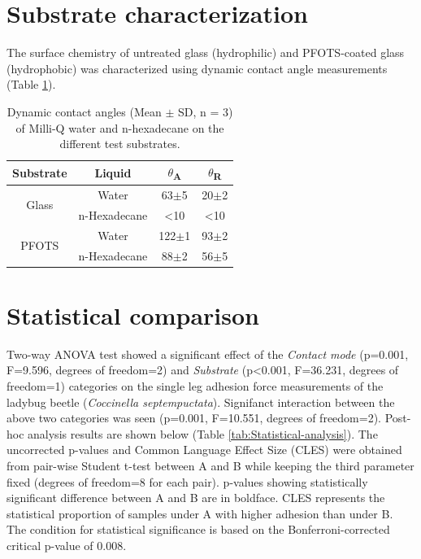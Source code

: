 \documentclass[english]{achemso}
\providecommand{\tabularnewline}{\\}
\begin{document}
\section{Substrate characterization}

The surface chemistry of untreated glass (hydrophilic) and PFOTS-coated glass (hydrophobic) was characterized using dynamic contact angle measurements (Table \ref{tab:Contact-Angles}).
\begin{table}[H]
\centering{}%
\begin{tabular}{|c|c|c|c|}
\hline 
Substrate & Liquid & \ensuremath{\theta}\textsubscript{A} & \ensuremath{\theta}\textsubscript{R}\tabularnewline
\hline 
\hline 
\multirow{2}{*}{Glass} & Water & 63\ensuremath{\pm}5\textdegree{} & 20\ensuremath{\pm}2\textdegree{}\tabularnewline
\cline{2-4} \cline{3-4} \cline{4-4} 
 & n-Hexadecane & <10\textdegree{} & <10\textdegree{}\tabularnewline
\hline 
\multirow{2}{*}{PFOTS} & Water & 122\ensuremath{\pm}1\textdegree{} & 93\ensuremath{\pm}2\textdegree{}\tabularnewline
\cline{2-4} \cline{3-4} \cline{4-4} 
 & n-Hexadecane & 88\ensuremath{\pm}2\textdegree{} & 56\ensuremath{\pm}5\textdegree{}\tabularnewline
\hline 
\end{tabular}\caption{Dynamic contact angles (Mean \ensuremath{\pm} SD, n = 3) of Milli-Q water and n-hexadecane on the different test substrates. \label{tab:Contact-Angles}}
\end{table}


\section{Statistical comparison}

Two-way ANOVA test showed a significant effect of the \emph{Contact mode} (p=0.001, F=9.596, degrees of freedom=2) 
and \emph{Substrate} (p<0.001, F=36.231, degrees of freedom=1) categories on the single leg adhesion force measurements
of the ladybug beetle (\emph{Coccinella septempuctata}). Signifanct interaction between the above two categories was seen (p=0.001, F=10.551, degrees of freedom=2). Post-hoc analysis results are shown below (Table \ref{tab:Statistical-analysis}).
The uncorrected p-values and Common Language Effect Size (CLES) were
obtained from pair-wise Student t-test between A and B while
keeping the third parameter fixed (degrees of freedom=8 for each pair). p-values showing statistically
significant difference between A and B are in boldface. 
CLES represents the statistical proportion of samples under A with higher adhesion than under B. The condition
for statistical significance is based on the Bonferroni-corrected
critical p-value of 0.008.
\end{document}
